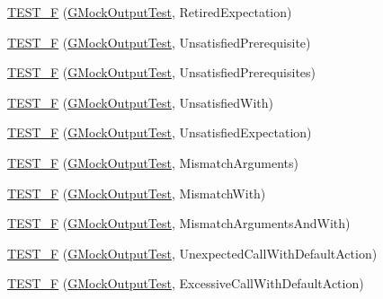 \begin{DoxyCompactItemize}
\item 
\mbox{\hyperlink{googletest-master_2googlemock_2test_2gmock__output__test___8cc_a887f8f9cf09ffea984dcdb87c692c745}{T\+E\+S\+T\+\_\+F}} (\mbox{\hyperlink{class_g_mock_output_test}{G\+Mock\+Output\+Test}}, Retired\+Expectation)
\item 
\mbox{\hyperlink{googletest-master_2googlemock_2test_2gmock__output__test___8cc_aab78247f3f1aa1b95feb21150d8e7643}{T\+E\+S\+T\+\_\+F}} (\mbox{\hyperlink{class_g_mock_output_test}{G\+Mock\+Output\+Test}}, Unsatisfied\+Prerequisite)
\item 
\mbox{\hyperlink{googletest-master_2googlemock_2test_2gmock__output__test___8cc_aa8df8651de0f2d9f7d1dd765eec89998}{T\+E\+S\+T\+\_\+F}} (\mbox{\hyperlink{class_g_mock_output_test}{G\+Mock\+Output\+Test}}, Unsatisfied\+Prerequisites)
\item 
\mbox{\hyperlink{googletest-master_2googlemock_2test_2gmock__output__test___8cc_a3e14c0f9607348fdca074ccc6589fbdd}{T\+E\+S\+T\+\_\+F}} (\mbox{\hyperlink{class_g_mock_output_test}{G\+Mock\+Output\+Test}}, Unsatisfied\+With)
\item 
\mbox{\hyperlink{googletest-master_2googlemock_2test_2gmock__output__test___8cc_a662a66a60e7b302feb2dfa4a6b59bf98}{T\+E\+S\+T\+\_\+F}} (\mbox{\hyperlink{class_g_mock_output_test}{G\+Mock\+Output\+Test}}, Unsatisfied\+Expectation)
\item 
\mbox{\hyperlink{googletest-master_2googlemock_2test_2gmock__output__test___8cc_a0e3e9858cc7be4771edbe0f346f304f4}{T\+E\+S\+T\+\_\+F}} (\mbox{\hyperlink{class_g_mock_output_test}{G\+Mock\+Output\+Test}}, Mismatch\+Arguments)
\item 
\mbox{\hyperlink{googletest-master_2googlemock_2test_2gmock__output__test___8cc_a6e68cce05dc47eea2b0376a1ce4baa23}{T\+E\+S\+T\+\_\+F}} (\mbox{\hyperlink{class_g_mock_output_test}{G\+Mock\+Output\+Test}}, Mismatch\+With)
\item 
\mbox{\hyperlink{googletest-master_2googlemock_2test_2gmock__output__test___8cc_a4cea140a4bc751ea563614b827496a96}{T\+E\+S\+T\+\_\+F}} (\mbox{\hyperlink{class_g_mock_output_test}{G\+Mock\+Output\+Test}}, Mismatch\+Arguments\+And\+With)
\item 
\mbox{\hyperlink{googletest-master_2googlemock_2test_2gmock__output__test___8cc_a4ac1ba04aede81f6771240e1c719a28e}{T\+E\+S\+T\+\_\+F}} (\mbox{\hyperlink{class_g_mock_output_test}{G\+Mock\+Output\+Test}}, Unexpected\+Call\+With\+Default\+Action)
\item 
\mbox{\hyperlink{googletest-master_2googlemock_2test_2gmock__output__test___8cc_a521e2dc9f8197c96e992901a5e39f5cd}{T\+E\+S\+T\+\_\+F}} (\mbox{\hyperlink{class_g_mock_output_test}{G\+Mock\+Output\+Test}}, Excessive\+Call\+With\+Default\+Action)

\end{DoxyCompactItemize}
